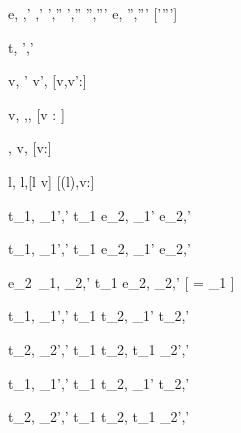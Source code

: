     {e,\hat{\sigma} \hat{\eval} ,\hat{\sigma}'  \Quad
     ,\hat{\sigma}' \hat{\stride} ',\hat{\sigma}''  \Quad
     ',\hat{\sigma}'' \hat{\normalise} '',\hat{\sigma}'''}
    {e,\hat{\sigma} \hat{\normalise} '',\hat{\sigma}'''}
    [\hat{\sigma}'\neq \hat{\sigma}''\vee {}\neq {}']




  {t,\hat{\sigma}  ',\hat{\sigma}'}


  { }
  {\Edit v,\hat{\sigma} ' \Edit v',\hat{\sigma}}
  [v,v':\tau]

  { }
  {\Edit v,\sigma \handle{\Empty} \Enter \tau,\sigma,\True}
  [v : \tau]

  { }
  {\Enter \tau,\hat{\sigma}  \Edit v,\hat{\sigma}}
  [v:\tau]

  { }
  {\Update l,\hat{\sigma}  \Update l,\hat{\sigma}[l \mapsto v]}
  [\hat\sigma(l),v:\tau]

  {t_1,\hat\sigma {} _1',\hat\sigma'}
  {t_1 \Then e_2,\hat\sigma {} _1' \Then e_2,\hat\sigma'}

  {t_1,\hat\sigma {} _1',\hat\sigma'}
  {t_1 \Next e_2,\hat\sigma {} _1' \Next e_2,\hat\sigma'}

  {e_2\ _1,\hat\sigma \hat{\normalise} _2,\hat{\sigma}'}
  {t_1 \Next e_2,\hat\sigma \xrightarrow[]{\Continue} _2,\hat{\sigma}'}
  [ = _1 \land \neg{}]


  {t_1,\hat\sigma {} _1',\hat{\sigma}'}
  {t_1 \And t_2,\hat\sigma {} _1' \And t_2,\hat{\sigma}'}

  {t_2,\hat\sigma {} _2',\hat{\sigma}'}
  {t_1 \And t_2,\hat\sigma {} t_1 \And {}_2',\hat{\sigma}'}


  {t_1,\hat\sigma {} _1',\hat{\sigma}'}
  {t_1 \Or t_2,\hat\sigma {} _1' \Or t_2,\hat{\sigma}'}

  {t_2,\hat\sigma {} _2',\hat{\sigma}' }
  {t_1 \Or t_2,\hat\sigma {} t_1 \Or {}_2',\hat{\sigma}'}



